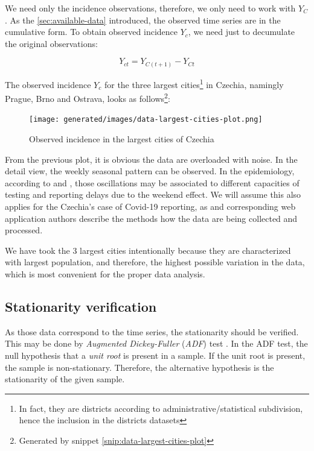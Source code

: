 \documentclass[
  digital, %
  oneside, %
  lof,     %
  lot,     %
]{fithesis4}
\begin{document}
We need only the incidence observations, therefore, we only
need to work with $Y_C$.
As the \autoref{sec:available-data} introduced, the observed time
series are in the cumulative form.
To obtain observed incidence $Y_c$,
we need just to decumulate the original observations:

\begin{equation}
  Y_{ct} = Y_{C(t + 1)} - Y_{Ct}
\end{equation}

The observed incidence $Y_c$ for the three largest 
cities\footnote{In fact, they are districts according to 
administrative/statistical subdivision, hence the inclusion in the districts datasets} in Czechia, 
namingly Prague, Brno and Ostrava, looks as 
follows\footnote{Generated by snippet 
\ref{snip:data-largest-cities-plot}}:

\begin{figure}[H]
  \begin{center}
    \texttt{[image: generated/images/data-largest-cities-plot.png]}
  \end{center}
  \caption{Observed incidence in the largest cities of Czechia}
  \label{fig:largest-cities-incidence}
\end{figure}

From the previous plot, it is obvious the data are overloaded 
with noise. 
In the detail view, the weekly seasonal pattern can be observed. 
In the epidemiology, according to \cite{liu2021} and \cite{annunziato2020}, 
those oscillations may be associated to different capacities 
of testing and reporting delays due to the weekend effect. 
We will assume this also applies for the Czechia's case of 
Covid-19 reporting, as \cite{komenda2020} and corresponding web 
application authors describe the methods how the data are
being collected and processed.

We have took the 3 largest cities intentionally because they
are characterized with largest population, and therefore, the 
highest possible variation in the data, which is most convenient 
for the proper data analysis.


\subsection{Stationarity verification}

As those data correspond to the time series, the stationarity 
should be verified. 
This may be done by \textit{Augmented Dickey-Fuller} (\textit{ADF}) 
test \cite{dickey1979}. 
In the ADF test, the null hypothesis that a \textit{unit root} is 
present in a sample. 
If the unit root is present, the sample is non-stationary. 
Therefore, the alternative hypothesis is the stationarity of 
the given sample.
\end{document}
